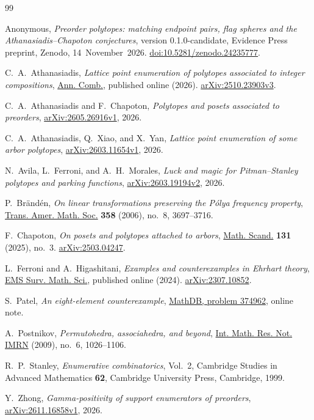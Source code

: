 \documentclass[11pt,letterpaper]{article}
\theoremstyle{result}
\theoremstyle{definition}
\theoremstyle{remark}
\begin{document}
\begin{thebibliography}{99}
\small\raggedright
\setlength{\itemsep}{3pt plus 1pt}
\setlength{\parskip}{0pt}

Anonymous,
\emph{Preorder polytopes: matching endpoint pairs, flag spheres and the Athanasiadis--Chapoton conjectures},
version 0.1.0-candidate, Evidence Press preprint, Zenodo, 14~November~2026.
\href{https://doi.org/10.5281/zenodo.24235777}{doi:10.5281/zenodo.24235777}.

C.~A.~Athanasiadis,
\emph{Lattice point enumeration of polytopes associated to integer compositions},
\href{https://doi.org/10.1007/s00026-026-00812-2}{Ann. Comb.}, published online (2026).
\href{https://arxiv.org/abs/2510.23903v3}{arXiv:2510.23903v3}.

C.~A.~Athanasiadis and F.~Chapoton,
\emph{Polytopes and posets associated to preorders},
\href{https://arxiv.org/abs/2605.26916v1}{arXiv:2605.26916v1}, 2026.

C.~A.~Athanasiadis, Q.~Xiao, and X.~Yan,
\emph{Lattice point enumeration of some arbor polytopes},
\href{https://arxiv.org/abs/2603.11654v1}{arXiv:2603.11654v1}, 2026.

N.~Avila, L.~Ferroni, and A.~H.~Morales,
\emph{Luck and magic for Pitman--Stanley polytopes and parking functions},
\href{https://arxiv.org/abs/2603.19194v2}{arXiv:2603.19194v2}, 2026.

P.~Br\"and\'en,
\emph{On linear transformations preserving the P\'olya frequency property},
\href{https://doi.org/10.1090/S0002-9947-06-03856-6}{Trans. Amer. Math. Soc.} \textbf{358} (2006), no.~8, 3697--3716.

F.~Chapoton,
\emph{On posets and polytopes attached to arbors},
\href{https://doi.org/10.7146/math.scand.a-159563}{Math. Scand.} \textbf{131} (2025), no.~3.
\href{https://arxiv.org/abs/2503.04247}{arXiv:2503.04247}.

L.~Ferroni and A.~Higashitani,
\emph{Examples and counterexamples in Ehrhart theory},
\href{https://doi.org/10.4171/EMSS/86}{EMS Surv. Math. Sci.}, published online (2024).
\href{https://arxiv.org/abs/2307.10852}{arXiv:2307.10852}.

S.~Patel,
\emph{An eight-element counterexample},
\href{https://mathdb.com/p/374962/real-rootedness-conjecture-for-preorder-polytope-h-polynomia}{MathDB, problem 374962}, online note.

A.~Postnikov,
\emph{Permutohedra, associahedra, and beyond},
\href{https://doi.org/10.1093/imrn/rnn153}{Int. Math. Res. Not. IMRN} (2009), no.~6, 1026--1106.

R.~P.~Stanley,
\emph{Enumerative combinatorics}, Vol.~2,
Cambridge Studies in Advanced Mathematics \textbf{62}, Cambridge University Press, Cambridge, 1999.

Y.~Zhong,
\emph{Gamma-positivity of support enumerators of preorders},
\href{https://arxiv.org/abs/2611.16858v1}{arXiv:2611.16858v1}, 2026.

\end{thebibliography}
\end{document}
